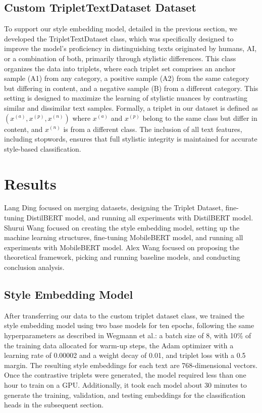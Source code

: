 \documentclass{article}
\begin{document}
\subsection{Custom TripletTextDataset Dataset}

To support our style embedding model, detailed in the previous section, we developed the TripletTextDataset class, which was specifically designed to improve the model’s proficiency in distinguishing texts originated by humans, AI, or a combination of both, primarily through stylistic differences. This class organizes the data into triplets, where each triplet set comprises an anchor sample (A1) from any category, a positive sample (A2) from the same category but differing in content, and a negative sample (B) from a different category. This setting is designed to maximize the learning of stylistic nuances by contrasting similar and dissimilar text samples. Formally, a triplet in our dataset is defined as \( (x^{(a)}, x^{(p)}, x^{(n)}) \) where \( x^{(a)} \) and \( x^{(p)} \) belong to the same class but differ in content, and \( x^{(n)} \) is from a different class. The inclusion of all text features, including stopwords, ensures that full stylistic integrity is maintained for accurate style-based classification. 


\section{Results}

Lang Ding focused on merging datasets, designing the Triplet Dataset, fine-tuning DistilBERT model, and running all experiments with DistilBERT model. Shurui Wang focused on creating the style embedding model, setting up the machine learning structures, fine-tuning MobileBERT model, and running all experiments with MobileBERT model. Alex Wang focused on proposing the theoretical framework, picking and running baseline models, and conducting conclusion analysis.

\subsection{Style Embedding Model}

After transferring our data to the custom triplet dataset class, we trained the style embedding model using two base models for ten epochs, following the same hyperparameters as described in Wegmann et al.\cite{StyleEmbedding}: a batch size of 8, with 10\% of the training data allocated for warm-up steps, the Adam optimizer with a learning rate of 0.00002 and a weight decay of 0.01, and triplet loss with a 0.5 margin. The resulting style embeddings for each text are 768-dimensional vectors. Once the contrastive triplets were generated, the model required less than one hour to train on a GPU. Additionally, it took each model about 30 minutes to generate the training, validation, and testing embeddings for the classification heads in the subsequent section.
\end{document}
